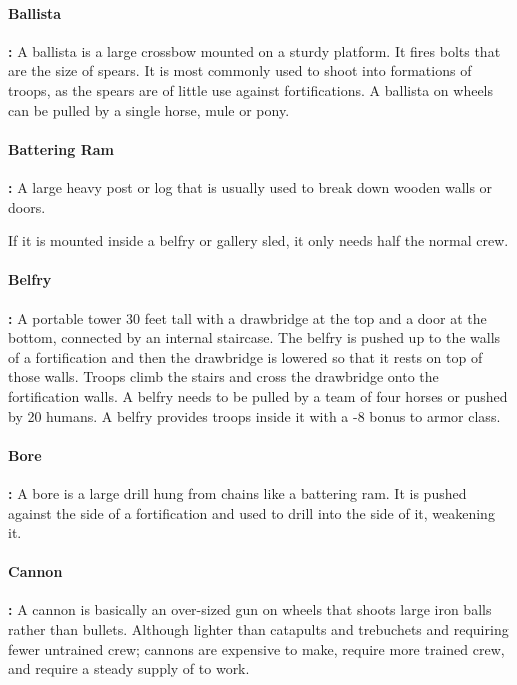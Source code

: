 \begin{multicols*}{2}

\paragraph{Ballista}\textbf{:} A ballista is a large crossbow mounted on a sturdy platform. It fires bolts that are the size of spears. It is most commonly used to shoot into formations of troops, as the spears are of little use against fortifications. A ballista on wheels can be pulled by a single horse, mule or pony.

\paragraph{Battering Ram}\textbf{:} A large heavy post or log that is usually used to break down wooden walls or doors.

If it is mounted inside a belfry or gallery sled, it only needs half the normal crew.

\paragraph{Belfry}\textbf{:} A portable tower 30 feet tall with a drawbridge at the top and a door at the bottom, connected by an internal staircase. The belfry is pushed up to the walls of a fortification and then the drawbridge is lowered so that it rests on top of those walls. Troops climb the stairs and cross the drawbridge onto the fortification walls. A belfry needs to be pulled by a team of four horses or pushed by 20 humans. A belfry provides troops inside it with a -8 bonus to armor class.

\paragraph{Bore}\textbf{:} A bore is a large drill hung from chains like a battering ram. It is pushed against the side of a fortification and used to drill into the side of it, weakening it.

\paragraph{Cannon}\textbf{:} A cannon is basically an over-sized gun on wheels that shoots large iron balls rather than bullets. Although lighter than catapults and trebuchets and requiring fewer untrained crew; cannons are expensive to make, require more trained crew, and require a steady supply of  to work.


\end{multicols*}
